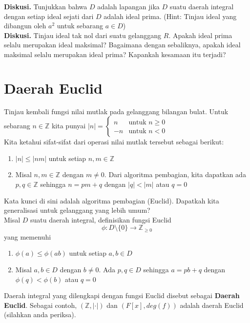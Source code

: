 	\textbf{Diskusi.} Tunjukkan bahwa $D$ adalah lapangan jika $D$ suatu daerah integral dengan setiap ideal sejati dari $D$ adalah ideal prima. (Hint: Tinjau ideal yang dibangun oleh $a^2$ untuk sebarang $a \in D$)\\
	
	\textbf{Diskusi.} Tinjau ideal tak nol dari suatu gelanggang $R$. Apakah ideal prima selalu merupakan ideal maksimal? Bagaimana dengan sebaliknya, apakah ideal maksimal selalu merupakan ideal prima? Kapankah kesamaan itu terjadi?
	\section{Daerah Euclid}
	Tinjau kembali fungsi nilai mutlak pada gelanggang bilangan bulat. Untuk sebarang $n \in \mathbb{Z}$ kita punyai $|n| = \begin{cases}
	n &\mbox{untuk $n \ge 0$}\\
	-n &\mbox{untuk $n < 0$}
	\end{cases}$\\
	Kita ketahui sifat-sifat dari operasi nilai mutlak tersebut sebagai berikut:
	\begin{enumerate}
		\item $|n| \le |nm|$ untuk setiap $n,m \in \mathbb{Z}$
		\item Misal $n, m \in \mathbb{Z}$ dengan $m \ne 0$. Dari algoritma pembagian, kita dapatkan ada $p,q \in \mathbb{Z}$ sehingga $n = pm + q$ dengan $|q| < |m|$ atau $q = 0$
	\end{enumerate}
	Kata kunci di sini adalah algoritma pembagian (Euclid). Dapatkah kita generalisasi untuk gelanggang yang lebih umum?\\
	
	Misal $D$ suatu daerah integral, definisikan fungsi Euclid $$\phi: D \setminus \{0\} \rightarrow \mathbb{Z}_{\ge 0}$$
	yang memenuhi \begin{enumerate}
		\item $\phi(a) \le \phi(ab)$ untuk setiap $a,b \in D$
		\item Misal $a,b \in D$ dengan $b \ne 0$. Ada $p,q \in D$ sehingga $a = pb + q$ dengan $\phi(q) < \phi(b)$ atau $q = 0$
	\end{enumerate}
	Daerah integral yang dilengkapi dengan fungsi Euclid disebut sebagai \textbf{Daerah Euclid}. Sebagai contoh, $(\mathbb{Z}, | \cdot |)$ dan $(F[x], deg(f))$ adalah daerah Euclid (silahkan anda periksa).\\
	
